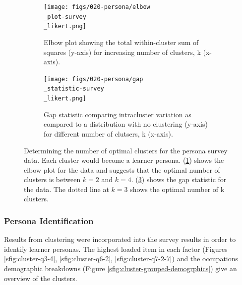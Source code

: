 \documentclass[020-persona\_validation.tex]{subfiles}
\begin{document}
        \begin{figure}[htb]
            \centering
            \begin{subfigure}[h]{0.45\textwidth}
                \centering
                \texttt{[image: figs/020-persona/elbow\\\_plot-survey\\\_likert.png]}
                \caption[Elbow plot for determining optimal number of clusters.]
                {Elbow plot showing the total within-cluster sum of squares (y-axis) for increasing number of clusters, k (x-axis).
                }
                \label{sfig:cluster-elbow}
            \end{subfigure}
            \begin{subfigure}[h]{0.45\textwidth}
                \centering
                \texttt{[image: figs/020-persona/gap\\\_statistic-survey\\\_likert.png]}
                \caption[Gap statistic for determining optimal number of clusters.]
                {Gap statistic comparing
                    intracluster variation as compared to a distribution with no clustering (y-axis)
                    for different number of clutsers, k (x-axis).
                }
                \label{sfig:cluster-gap}
            \end{subfigure}
            \caption[Elbow plot and Gap statistic for optimal number of clusters.]
            {Determining the number of optimal clusters for the persona survey data.
                Each cluster would become a learner persona.
                (\ref{sfig:cluster-elbow}) shows the elbow plot for the data and
                suggests that the optimal number of clusters is between $k=2$ and $k=4$.
                (\ref{sfig:cluster-gap}) shows the gap statistic for the data.
                The dotted line at $k=3$ shows the optimal number of k clusters.
            }
        \end{figure}

    \subsubsection{Persona Identification}

        Results from clustering were incorporated into the survey results in order to identify learner personas.
        The highest loaded item in each factor
        (Figures \ref{sfig:cluster-q3-4}, \ref{sfig:cluster-q6-2}, \ref{sfig:cluster-q7-2-7})
        and the occupations demographic breakdowns
        (Figure \ref{sfig:cluster-grouped-demogrphics})
        give an overview of the clusters.
\end{document}
